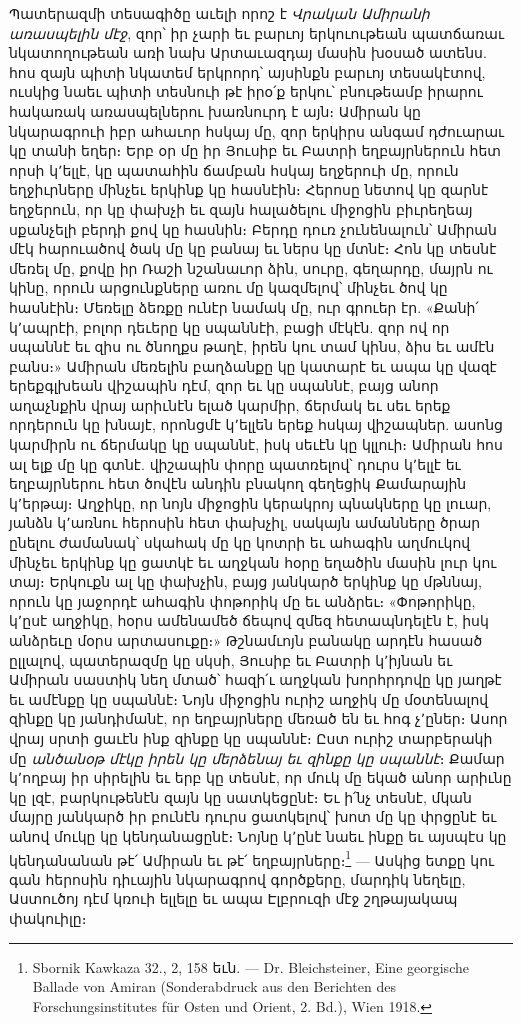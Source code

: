 \documentclass{article}
\begin{document}
{Պատերազմի տեսագիծը աւելի որոշ է \emph{Վրական Ամիրանի առասպելին մէջ}, զոր՝ իր չարի եւ բարւոյ երկուութեան պատճառաւ նկատողութեան առի նախ Արտաւազդայ մասին խօսած ատենս. հոս զայն պիտի նկատեմ երկրորդ՝ այսինքն բարւոյ տեսակէտով, ուսկից նաեւ պիտի տեսնուի թէ իրօ՛ք երկու՝ բնութեամբ իրարու հակառակ առասպելներու խառնուրդ է այն։ Ամիրան կը նկարագրուի իբր ահաւոր հսկայ մը, զոր երկիրս անգամ դժուարաւ կը տանի եղեր։ Երբ օր մը իր Յուսիբ եւ Բատրի եղբայրներուն հետ որսի կ՚ելլէ, կը պատահին ճամբան հսկայ եղջերուի մը, որուն եղջիւրները մինչեւ երկինք կը հասնէին։ Հերոսը նետով կը զարնէ եղջերուն, որ կը փախչի եւ զայն հալածելու միջոցին բիւրեղեայ սքանչելի բերդի քով կը հասնին։ Բերդը դուռ չունենալուն՝ Ամիրան մէկ հարուածով ծակ մը կը բանայ եւ ներս կը մտնէ։ Հոն կը տեսնէ մեռել մը, քովը իր Ռաշի նշանաւոր ձին, սուրը, գեղարդը, մայրն ու կինը, որուն արցունքները առու մը կազմելով՝ մինչեւ ծով կը հասնէին։ Մեռելը ձեռքը ունէր նամակ մը, ուր գրուեր էր. «Քանի՛ կ՚ապրէի, բոլոր դեւերը կը սպաննէի, բացի մէկէն. զոր ով որ սպաննէ եւ զիս ու ծնողքս թաղէ, իրեն կու տամ կինս, ձիս եւ ամէն բանս։» Ամիրան մեռելին բաղձանքը կը կատարէ եւ ապա կը վազէ երեքգլխեան վիշապին դէմ, զոր եւ կը սպաննէ, բայց անոր աղաչնքին վրայ արիւնէն ելած կարմիր, ճերմակ եւ սեւ երեք որդերուն կը խնայէ, որոնցմէ կ՚ելլեն երեք հսկայ վիշապներ. ասոնց կարմիրն ու ճերմակը կը սպաննէ, իսկ սեւէն կը կլլուի։ Ամիրան հոս ալ ելք մը կը գտնէ. վիշապին փորը պատռելով՝ դուրս կ՚ելլէ եւ եղբայրներու հետ ծովէն անդին բնակող գեղեցիկ Քամարային կ՚երթայ։ Աղջիկը, որ նոյն միջոցին կերակրոյ պնակները կը լուար, յանձն կ՚առնու հերոսին հետ փախչիլ, սակայն ամանները ծրար ընելու ժամանակ՝ սկահակ մը կը կոտրի եւ ահագին աղմուկով մինչեւ երկինք կը ցատկէ եւ աղջկան հօրը եղածին մասին լուր կու տայ։ Երկուքն ալ կը փախչին, բայց յանկարծ երկինք կը մթննայ, որուն կը յաջորդէ ահագին փոթորիկ մը եւ անձրեւ։ «Փոթորիկը, կ՚ըսէ աղջիկը, հօրս ամենամեծ ճեպով զմեզ հետապնդելէն է, իսկ անձրեւը մօրս արտասուքը։» Թշնամւոյն բանակը արդէն հասած ըլլալով, պատերազմը կը սկսի, Յուսիբ եւ Բատրի կ՚իյնան եւ Ամիրան սաստիկ նեղ մտած՝ հազի՛ւ աղջկան խորհրդովը կը յաղթէ եւ ամէնքը կը սպաննէ։ Նոյն միջոցին ուրիշ աղջիկ մը մօտենալով զինքը կը յանդիմանէ, որ եղբայրները մեռած են եւ հոգ չ՚ըներ։ Ասոր վրայ սրտի ցաւէն ինք զինքը կը սպաննէ։ Ըստ ուրիշ տարբերակի մը \emph{անծանօթ մէկը իրեն կը մերձենայ եւ զինքը կը սպաննէ}։ Քամար կ՚ողբայ իր սիրելին եւ երբ կը տեսնէ, որ մուկ մը եկած անոր արիւնը կը լզէ, բարկութենէն զայն կը սատկեցընէ։ Եւ ի՛նչ տեսնէ, մկան մայրը յանկարծ իր բունէն դուրս ցատկելով՝ խոտ մը կը փրցընէ եւ անով մուկը կը կենդանացընէ։ Նոյնը կ՚ընէ նաեւ ինքը եւ այսպէս կը կենդանանան թէ՛ Ամիրան եւ թէ՛ եղբայրները։\footnote{Sbornik Kawkaza 32., 2, 158 եւն. — Dr. Bleichsteiner, Eine georgische Ballade von Amiran (Sonderabdruck aus den Berichten des Forschungsinstitutes für Osten und Orient, 2. Bd.), Wien 1918.} — Ասկից ետքը կու գան հերոսին դիւային նկարագրով գործքերը, մարդիկ նեղելը, Աստուծոյ դէմ կռուի ելլելը եւ ապա Էլբրուզի մէջ շղթայակապ փակուիլը։

}
\end{document}
